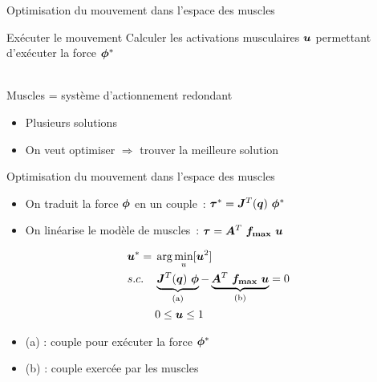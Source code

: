 \begin{frame}{Optimisation du mouvement dans l'espace des muscles}
    \begin{small}
        \begin{block}{Exécuter le mouvement}
            Calculer les activations musculaires $\boldsymbol{u}$ permettant d'exécuter la force $\boldsymbol{\phi}^*$
        \end{block}
        ~\\
        Muscles = système d'actionnement redondant
        \begin{itemize}
            \item Plusieurs solutions
            \item On veut optimiser $\Rightarrow$ trouver la meilleure solution
        \end{itemize}
    \end{small}
    \begin{figure}
        \centering
        
    \end{figure}
\end{frame}

\begin{frame}{Optimisation du mouvement dans l'espace des muscles}
    \begin{itemize}
        \item On traduit la force $\boldsymbol{\phi}$ en un couple~: $\boldsymbol{\tau}^* = \boldsymbol{J}^T(\boldsymbol{q}) ~ \boldsymbol{\phi}^*$
        \item On linéarise le modèle de muscles~: $\boldsymbol{\tau} = \boldsymbol{A}^T ~ \boldsymbol{f_{\max}} ~ \boldsymbol{u}$
    \end{itemize}
    \begin{align*}
        \boldsymbol{u}^*  = {} & \arg\min_{u} [\boldsymbol{u}^2] \\
        s.c.~~~     & \underbrace{\boldsymbol{J}^T(\boldsymbol{q}) ~ \boldsymbol{\phi}}_\text{(a)} - \underbrace{\boldsymbol{A}^T ~ \boldsymbol{f_{\max}} ~ \boldsymbol{u}}_\text{(b)} = 0 \\
                       & 0  \leq \boldsymbol{u} \leq 1
    \end{align*}
    \begin{itemize}
        \item (a) : couple pour exécuter la force $\boldsymbol{\phi}^*$
        \item (b) : couple exercée par les muscles
    \end{itemize}
\end{frame}

%        
%        

